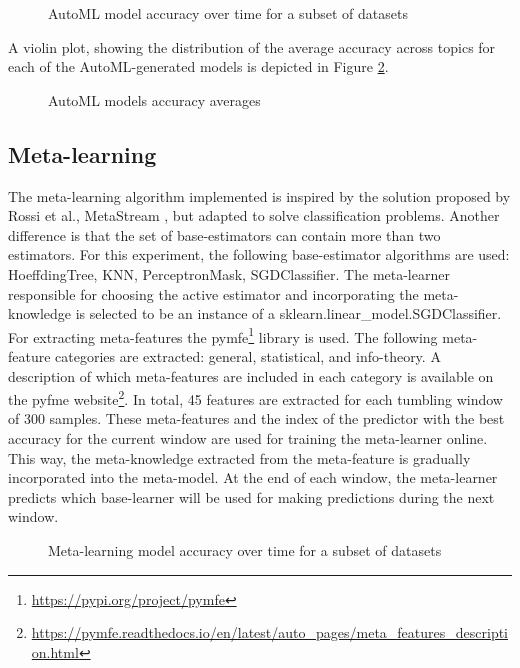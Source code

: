 \documentclass{sig-alternate-br}
\begin{document}
\begin{figure}[h!]
\centering 
{}
\caption{AutoML model accuracy over time for a subset of datasets}
\label{fig:automl_tpot}
\end{figure}

\vspace{2cm}
A violin plot, showing the distribution of the average accuracy across topics for each of the AutoML-generated models is depicted in Figure \ref{fig:automl_violin}.

\begin{figure}[h!]
\centering 
{}
\caption{AutoML models accuracy averages}
\label{fig:automl_violin}
\end{figure}

\subsection{Meta-learning}

The meta-learning algorithm implemented is inspired by the solution proposed by Rossi et al., MetaStream \cite{rossi2014metastream}, but adapted to solve classification problems. Another difference is that the set of base-estimators can contain more than two estimators. For this experiment, the following base-estimator algorithms are used: HoeffdingTree, KNN, PerceptronMask, SGDClassifier. The meta-learner responsible for choosing the active estimator and incorporating the meta-knowledge is selected to be an instance of a sklearn.linear\_model.SGDClassifier. For extracting meta-features the pymfe\footnote{\url{https://pypi.org/project/pymfe}} library is used. The following meta-feature categories are extracted: general, statistical, and info-theory. A description of which meta-features are included in each category is available on the pyfme website\footnote{\url{https://pymfe.readthedocs.io/en/latest/auto_pages/meta_features_description.html}}. In total, 45 features are extracted for each tumbling window of 300 samples. These meta-features and the index of the predictor with the best accuracy for the current window are used for training the meta-learner online. This way, the meta-knowledge extracted from the meta-feature is gradually incorporated into the meta-model. At the end of each window, the meta-learner predicts which base-learner will be used for making predictions during the next window. 

\begin{figure}[h]
\centering 
{}
\caption{Meta-learning model accuracy over time for a subset of datasets}
\label{fig:meta}
\end{figure}
\end{document}
